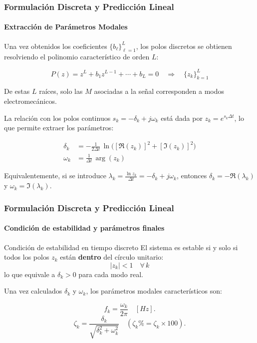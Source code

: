 \documentclass{beamer}
\begin{document}
\begin{frame}
\frametitle{Formulación Discreta y Predicción Lineal}
\framesubtitle{Extracción de Parámetros Modales}

Una vez obtenidos los coeficientes $\{b_\ell\}_{\ell=1}^{L}$, los polos discretos se obtienen resolviendo el polinomio característico de orden $L$:

\begin{equation}
    P(z) = z^{L} + b_1 z^{L-1} + \cdots + b_L = 0
    \quad \Rightarrow \quad \{z_k\}_{k=1}^{L}
    \label{eq:poly}
\end{equation}

De estas $L$ raíces, solo las $M$ asociadas a la señal corresponden a modos electromecánicos.

La relación con los polos continuos $s_k = -\delta_k + j\omega_k$ está dada por $z_k = e^{s_k \Delta t}$, lo que permite extraer los parámetros:

\begin{align}
    \delta_k &= -\frac{1}{2\Delta t}\,\ln\!\bigl([\Re(z_k)]^2 + [\Im(z_k)]^2\bigr) \label{eq:delta} \\
    \omega_k &= \frac{1}{\Delta t}\,\arg(z_k) \label{eq:omega}
\end{align}

\end{frame}


\begin{frame}
 Equivalentemente, si se introduce $\lambda_k = \frac{\ln z_k}{\Delta t} = -\delta_k + j\omega_k$, entonces
 $\delta_k = -\Re(\lambda_k)$ y $\omega_k = \Im(\lambda_k)$.
\end{frame}

\begin{frame}
    \frametitle{Formulación Discreta y Predicción Lineal}
    \framesubtitle{Condición de estabilidad y parámetros finales}

    \begin{alertblock}{Condición de estabilidad en tiempo discreto}
        El sistema es estable si y solo si todos los polos $z_k$ están \textbf{dentro} del círculo unitario:
        \begin{equation}
            |z_k| < 1 \quad \forall\, k
            \label{eq:stability_z}
        \end{equation}
        lo que equivale a $\delta_k > 0$ para cada modo real.
    \end{alertblock}

    \vspace{0.3em}
    Una vez calculados $\delta_k$ y $\omega_k$, los parámetros modales característicos son:

    \begin{equation}
    f_k = \dfrac{\omega_k}{2\pi}\quad [Hz].
    \label{eq:freq_final}
    \end{equation}
    \begin{equation}
    \zeta_k = \dfrac{\delta_k}{\sqrt{\delta_k^2 + \omega_k^2}} \quad ( \zeta_k\% = \zeta_k \times 100).
    \label{eq:damp_final}
    \end{equation}

\end{frame}
\end{document}
